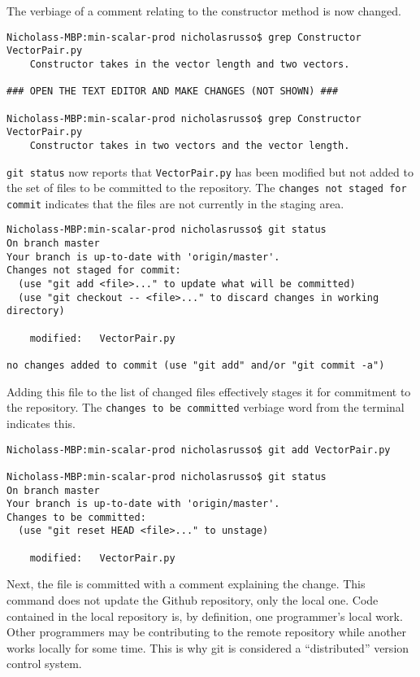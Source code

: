 The verbiage of a comment relating to the constructor method is now changed.

\begin{verbatim}
Nicholass-MBP:min-scalar-prod nicholasrusso$ grep Constructor VectorPair.py
    Constructor takes in the vector length and two vectors.

### OPEN THE TEXT EDITOR AND MAKE CHANGES (NOT SHOWN) ###

Nicholass-MBP:min-scalar-prod nicholasrusso$ grep Constructor VectorPair.py
    Constructor takes in two vectors and the vector length.
\end{verbatim}

\verb|git status| now reports that \verb|VectorPair.py| has been modified but
not added to the set of files to be committed to the repository.
The \verb|changes not staged for commit| indicates that the files are
not currently in the staging area.

\begin{verbatim}
Nicholass-MBP:min-scalar-prod nicholasrusso$ git status
On branch master
Your branch is up-to-date with 'origin/master'.
Changes not staged for commit:
  (use "git add <file>..." to update what will be committed)
  (use "git checkout -- <file>..." to discard changes in working directory)

	modified:   VectorPair.py

no changes added to commit (use "git add" and/or "git commit -a")
\end{verbatim}

Adding this file to the list of changed files effectively stages it for
commitment to the repository. The \verb|changes to be committed| verbiage
word from the terminal indicates this.

\begin{verbatim}
Nicholass-MBP:min-scalar-prod nicholasrusso$ git add VectorPair.py

Nicholass-MBP:min-scalar-prod nicholasrusso$ git status
On branch master
Your branch is up-to-date with 'origin/master'.
Changes to be committed:
  (use "git reset HEAD <file>..." to unstage)

	modified:   VectorPair.py
\end{verbatim}

Next, the file is committed with a comment explaining the change. This command
does not update the Github repository, only the local one. Code contained in
the local repository is, by definition, one programmer's local work. Other
programmers may be contributing to the remote repository while another works
locally for some time. This is why git is considered a ``distributed'' version
control system.

